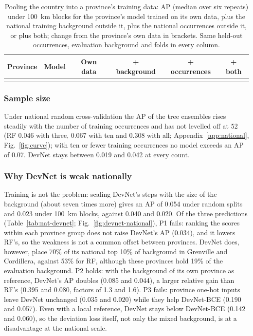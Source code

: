 \documentclass[pdflatex,sn-apa]{sn-jnl}
\begin{document}
\begin{table}[t]
\caption{Pooling the country into a province's training data: AP (median over six repeats) under 100~km blocks for the province's model trained on its own data, plus the national training background outside it, plus the national occurrences outside it, or plus both; change from the province's own data in brackets. Same held-out occurrences, evaluation background and folds in every column.}\label{tab:nat-pooling}
\scriptsize
\setlength{\tabcolsep}{2.5pt}
\begin{tabular*}{\textwidth}{@{\extracolsep\fill}llcccc}
\toprule
Province & Model & Own data & + background & + occurrences & + both \\
\midrule
\botrule
\end{tabular*}
\end{table}

\subsubsection{Sample size}\label{sec:res-curve}

Under national random cross-validation the AP of the tree ensembles rises steadily with the number of training occurrences and has not levelled off at 52 (RF 0.046 with three, 0.067 with ten and 0.308 with all; Appendix~\ref{app:national}, Fig.~\ref{fig:curve}); with ten or fewer training occurrences no model exceeds an AP of 0.07. DevNet stays between 0.019 and 0.042 at every count.

\subsubsection{Why DevNet is weak nationally}\label{sec:res-devnet-national}

Training is not the problem: scaling DevNet's steps with the size of the background (about seven times more) gives an AP of 0.054 under random splits and 0.023 under 100~km blocks, against 0.040 and 0.020. Of the three predictions (Table~\ref{tab:nat-devnet}; Fig.~\ref{fig:devnet-national}), P1 fails: ranking the scores within each province group does not raise DevNet's AP (0.034), and it lowers RF's, so the weakness is not a common offset between provinces. DevNet does, however, place 70\% of its national top 10\% of background in Grenville and Cordillera, against 53\% for RF, although these provinces hold 19\% of the evaluation background. P2 holds: with the background of its own province as reference, DevNet's AP doubles (0.085 and 0.044), a larger relative gain than RF's (0.395 and 0.080, factors of 1.3 and 1.6). P3 fails: province one-hot inputs leave DevNet unchanged (0.035 and 0.020) while they help DevNet-BCE (0.190 and 0.057). Even with a local reference, DevNet stays below DevNet-BCE (0.142 and 0.060), so the deviation loss itself, not only the mixed background, is at a disadvantage at the national scale.
\end{document}
